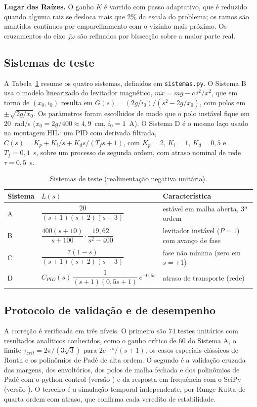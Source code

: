 \documentclass[12pt]{article}
\begin{document}
\textbf{Lugar das Raízes.} O ganho $K$ é varrido com passo adaptativo, que é reduzido quando alguma raiz se desloca mais que 2\% da escala do problema; os ramos são mantidos contínuos por emparelhamento com o vizinho mais próximo. Os cruzamentos do eixo $j\omega$ são refinados por bissecção sobre a maior parte real.

\subsection{Sistemas de teste}

A Tabela~\ref{tab:sistemas} resume os quatro sistemas, definidos em \texttt{sistemas.py}. O Sistema B usa o modelo linearizado do levitador magnético, $m\ddot{x}=mg-c\,i^2/x^2$, que em torno de $(x_0,i_0)$ resulta em $G(s)=(2g/i_0)/(s^2-2g/x_0)$, com polos em $\pm\sqrt{2g/x_0}$. Os parâmetros foram escolhidos de modo que o polo instável fique em $20$~rad/s ($x_0=2g/400\approx 4{,}9$~cm, $i_0=1$~A). O Sistema D é o mesmo laço usado na montagem HIL: um PID com derivada filtrada, $C(s)=K_p+K_i/s+K_ds/(T_fs+1)$, com $K_p=2$, $K_i=1$, $K_d=0{,}5$ e $T_f=0{,}1$~s, sobre um processo de segunda ordem, com atraso nominal de rede $\tau=0{,}5$~s.

\begin{table}[ht]
\centering
\caption{Sistemas de teste (realimentação negativa unitária).}
\label{tab:sistemas}
\small
\begin{tabular}{lll}
\toprule
Sistema & $L(s)$ & Característica \\
\midrule
A & $\dfrac{20}{(s+1)(s+2)(s+3)}$ & estável em malha aberta, 3ª ordem \\[2mm]
B & $\dfrac{400(s+10)}{s+100}\cdot\dfrac{19{,}62}{s^2-400}$ & levitador instável ($P=1$) com avanço de fase \\[2mm]
C & $\dfrac{7(1-s)}{(s+1)(s+2)(s+3)}$ & fase não mínima (zero em $s=+1$) \\[2mm]
D & $C_{PID}(s)\,\dfrac{1}{(s+1)(0{,}5s+1)}\,e^{-0{,}5s}$ & atraso de transporte (rede) \\
\bottomrule
\end{tabular}
\end{table}

\subsection{Protocolo de validação e de desempenho}

A correção é verificada em três níveis. O primeiro são 74 testes unitários com resultados analíticos conhecidos, como o ganho crítico de $60$ do Sistema A, o limite $\tau_{crit}=2\pi/(3\sqrt{3})$ para $2e^{-\tau s}/(s+1)$, os casos especiais clássicos de Routh e os polinômios de Padé de alta ordem. O segundo é a validação cruzada das margens, dos envoltórios, dos polos de malha fechada e dos polinômios de Padé com o python-control (versão \VerControl) e da resposta em frequência com o SciPy (versão \VerScipy). O terceiro é a simulação temporal independente, por Runge-Kutta de quarta ordem com atraso, que confirma cada veredito de estabilidade.
\end{document}

